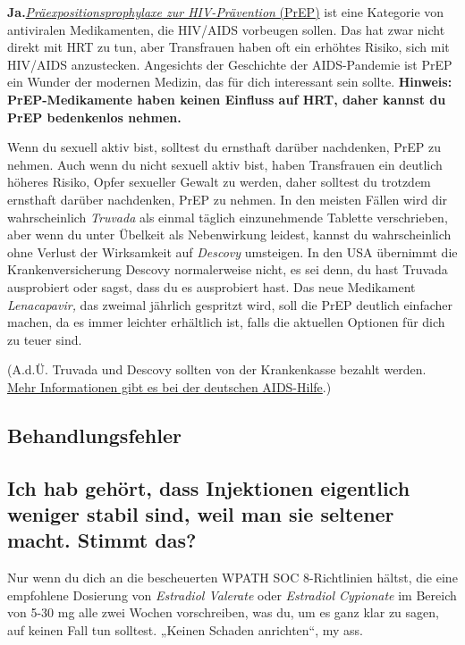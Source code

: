 \documentclass{article}
\begin{document}
{{{\textbf{Ja.}\href{https://de.wikipedia.org/wiki/Pr%C3%A4expositionsprophylaxe}{\textit{Präexpositionsprophylaxe zur HIV-Prävention} (PrEP)} ist eine Kategorie von antiviralen Medikamenten, die HIV/AIDS vorbeugen sollen. Das hat zwar nicht direkt mit HRT zu tun, aber Transfrauen haben oft ein erhöhtes Risiko, sich mit HIV/AIDS anzustecken. Angesichts der Geschichte der AIDS-Pandemie ist PrEP ein Wunder der modernen Medizin, das für dich interessant sein sollte. \textbf{Hinweis: PrEP-Medikamente haben keinen Einfluss auf HRT, daher kannst du PrEP bedenkenlos nehmen.}

								 
																	

Wenn du sexuell aktiv bist, solltest du ernsthaft darüber nachdenken, PrEP zu nehmen. Auch wenn du nicht sexuell aktiv bist, haben Transfrauen ein deutlich höheres Risiko, Opfer sexueller Gewalt zu werden, daher solltest du trotzdem ernsthaft darüber nachdenken, PrEP zu nehmen. In den meisten Fällen wird dir wahrscheinlich \textit{Truvada} als einmal täglich einzunehmende Tablette verschrieben, aber wenn du unter Übelkeit als Nebenwirkung leidest, kannst du wahrscheinlich ohne Verlust der Wirksamkeit auf \textit{Descovy} umsteigen. In den USA übernimmt die Krankenversicherung Descovy normalerweise nicht, es sei denn, du hast Truvada ausprobiert oder sagst, dass du es ausprobiert hast. Das neue Medikament \textit{Lenacapavir,} das zweimal jährlich gespritzt wird, soll die PrEP deutlich einfacher machen, da es immer leichter erhältlich ist, falls die aktuellen Optionen für dich zu teuer sind.

(A.d.Ü. Truvada und Descovy sollten von der Krankenkasse bezahlt werden. \href{https://www.aidshilfe.de/de/hiv-prep/prep-praxen-finden-kosten}{Mehr Informationen gibt es bei der deutschen AIDS-Hilfe}.)

\subsection*{Behandlungsfehler}

\subsection{Ich hab gehört, dass Injektionen eigentlich weniger stabil sind, weil man sie seltener macht. Stimmt das?}

Nur wenn du dich an die bescheuerten WPATH SOC 8-Richtlinien hältst, die eine empfohlene Dosierung von \textit{Estradiol Valerate} oder \textit{Estradiol Cypionate} im Bereich von 5-30 mg alle zwei Wochen vorschreiben, was du, um es ganz klar zu sagen, auf keinen Fall tun solltest. „Keinen Schaden anrichten“, my ass.

}}}
\end{document}
